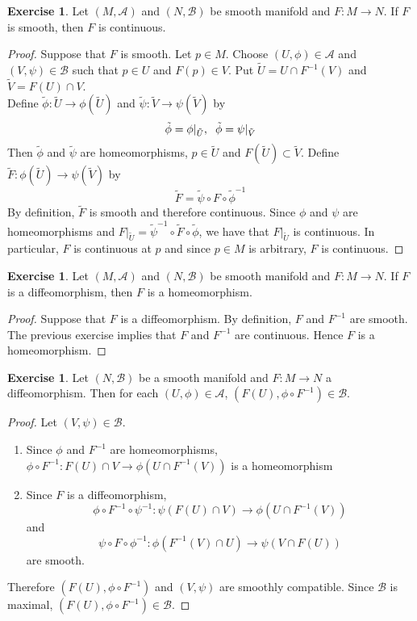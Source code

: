 \documentclass[12pt]{amsart}
\theoremstyle{definition}
\newtheorem{ex}[definition]{Exercise}
\newcommand{\MA}{\mathcal{A}}
\newcommand{\MB}{\mathcal{B}}
\newcommand{\tU}{\tilde{U}}
\newcommand{\tV}{\tilde{V}}
\newcommand{\tphi}{\tilde{\phi}}
\newcommand{\tpsi}{\tilde{\psi}}
\newcommand{\tF}{\tilde{F}}
\begin{document}
	\begin{ex}
	Let $(M, \MA)$ and $(N, \MB)$ be smooth manifold and $F: M \rightarrow N$. If $F$ is smooth, then $F$ is continuous. 
	\end{ex}
	
	\begin{proof}
	Suppose that $F$ is smooth. Let $p \in M$. Choose $(U, \phi) \in \MA$ and $(V, \psi) \in \MB$ such that $p \in U$ and $F(p) \in V$. Put $\tU = U \cap F^{-1}(V)$ and $\tV = F(U) \cap V$. \\
	Define $\tphi: \tU \rightarrow \phi(\tU)$ and $\tpsi: \tV \rightarrow \psi(\tV)$ by $$\tphi = \phi|_{\tU}, \hspace{.2cm} \tphi = \psi|_{\tV}$$ Then $\tphi$ and $\tpsi$ are homeomorphisms, $p \in \tU$ and $F(\tU) \subset \tV$. Define $\tF: \phi(\tU) \rightarrow \psi(\tV) $ by $$ \tF = \tpsi \circ F \circ \tphi^{-1}$$  
	By definition, $\tF$ is smooth and therefore continuous. Since $\phi$ and $\psi$ are homeomorphisms and $F|_{\tU} = \tpsi^{-1} \circ \tF \circ \tphi$, we have that $F|_{\tU}$ is continuous. In particular, $F$ is continuous at $p$ and since $p \in M$ is arbitrary, $F$ is continuous.
	\end{proof}
	
	\begin{ex}
	Let $(M, \MA)$ and $(N, \MB)$ be smooth manifold and $F: M \rightarrow N$. If $F$ is a diffeomorphism, then $F$ is a homeomorphism. 
	\end{ex}	
	
	\begin{proof}
	Suppose that $F$ is a diffeomorphism. By definition, $F$ and  $F^{-1}$ are smooth. The previous exercise implies that $F$ and $F^{-1}$ are continuous. Hence $F$  is a homeomorphism. 
	\end{proof}
	
	\begin{ex}
		Let $(N, \MB)$ be a smooth manifold and $F: M \rightarrow N$ a diffeomorphism. Then for each $(U, \phi) \in \MA$, $(F(U), \phi \circ F^{-1}) \in \MB$.
	\end{ex}
	
	\begin{proof}
		Let $(V, \psi) \in \MB$. 
		\begin{enumerate}
		\item Since $\phi$ and $F^{-1}$ are homeomorphisms, $\phi \circ F^{-1}: F(U) \cap V \rightarrow \phi(U \cap F^{-1}(V))$ is a homeomorphism
		\item Since $F$ is a diffeomorphism, $$\phi \circ F^{-1} \circ \psi^{-1}: \psi(F(U) \cap V) \rightarrow \phi(U \cap F^{-1}(V))$$ and $$\psi \circ F \circ \phi^{-1}: \phi(F^{-1}(V) \cap U) \rightarrow \psi(V \cap F(U))$$ are smooth. 
		\end{enumerate}
		
		Therefore $(F(U), \phi \circ F^{-1})$ and $(V, \psi)$ are smoothly compatible. Since $\MB$ is maximal, $(F(U), \phi \circ F^{-1}) \in \MB$.
	\end{proof}
\end{document}
